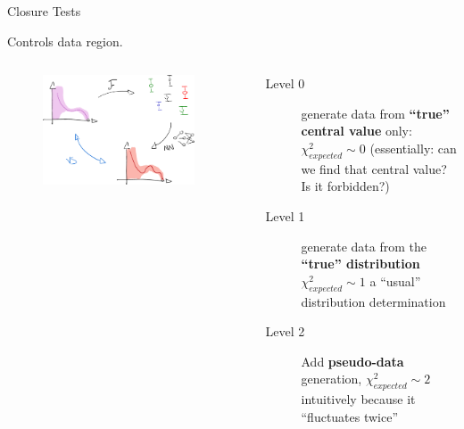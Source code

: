 \documentclass[9pt]{beamer}
\begin{document}
\begin{frame}{Closure Tests}
    \vspace*{10pt}

    Controls data region.
    \begin{columns}
        \begin{column}{0.5\textwidth}
            \begin{figure}
                \hspace*{20pt}
                \includegraphics[width=0.9\textwidth]{closure-tests}
            \end{figure}
        \end{column}
        \begin{column}{0.5\textwidth}
            \begin{description}
                \item[Level 0] generate data from \textbf{\enquote{true}
                    central value} only: $\chi^2_{expected} \sim 0$\newline
                    {\footnotesize (essentially: can we find that central
                    value? Is it forbidden?)}
                \item[Level 1] generate data from the \textbf{\enquote{true}
                    distribution} $\chi^2_{expected} \sim 1$\newline
                    {\footnotesize a \enquote{usual} distribution
                    determination}
                \item[Level 2] Add \textbf{pseudo-data} generation,
                    $\chi^2_{expected} \sim 2$\newline
                    {\footnotesize intuitively because it \enquote{fluctuates twice}}
            \end{description}
            \vspace*{20pt}
            

\end{column}
\end{columns}
\end{frame}
\end{document}

